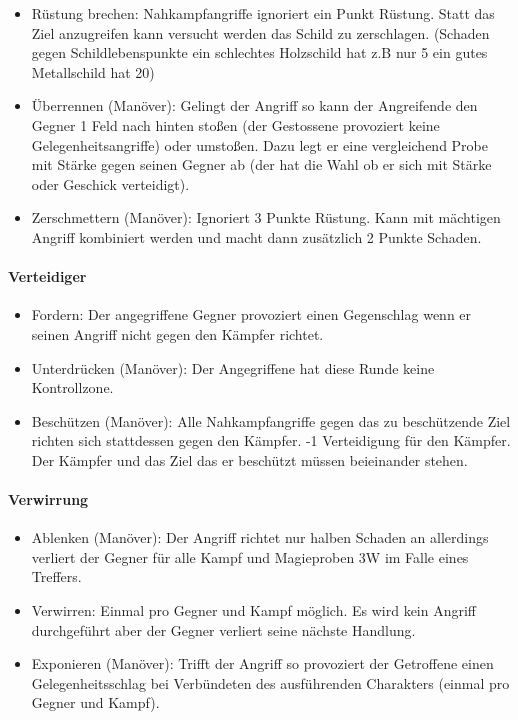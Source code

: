 \documentclass{article}
\begin{document}
\begin{itemize}
\item Rüstung brechen: Nahkampfangriffe ignoriert ein Punkt Rüstung. Statt das Ziel anzugreifen kann versucht werden das Schild zu zerschlagen. (Schaden gegen Schildlebenspunkte ein schlechtes Holzschild  hat z.B nur 5 ein gutes Metallschild hat 20)
\item Überrennen (Manöver): Gelingt der Angriff so kann der Angreifende den Gegner 1 Feld nach hinten stoßen (der Gestossene provoziert keine Gelegenheitsangriffe) oder umstoßen. Dazu legt er eine vergleichend Probe mit Stärke gegen seinen Gegner ab (der hat die Wahl ob er sich mit Stärke oder Geschick verteidigt).
\item Zerschmettern (Manöver): Ignoriert 3 Punkte Rüstung. Kann mit mächtigen Angriff kombiniert werden und macht dann zusätzlich 2 Punkte Schaden.
\end{itemize}

\paragraph{Verteidiger}

\begin{itemize}
\item Fordern: Der angegriffene Gegner provoziert einen Gegenschlag wenn er seinen Angriff nicht gegen den Kämpfer richtet.
\item Unterdrücken (Manöver): Der Angegriffene hat diese Runde keine Kontrollzone.
\item Beschützen (Manöver): Alle Nahkampfangriffe gegen das zu beschützende Ziel richten sich stattdessen gegen den Kämpfer. -1 Verteidigung für den Kämpfer. Der Kämpfer und das Ziel das er beschützt müssen beieinander stehen.
\end{itemize}

\paragraph{Verwirrung}

\begin{itemize}
\item Ablenken (Manöver): Der Angriff richtet nur halben Schaden an allerdings verliert der Gegner für alle Kampf und Magieproben 3W im Falle eines Treffers.
\item Verwirren: Einmal pro Gegner und Kampf möglich. Es wird kein Angriff durchgeführt aber der Gegner verliert seine nächste Handlung.
\item Exponieren (Manöver): Trifft der Angriff so provoziert der Getroffene einen Gelegenheitsschlag bei Verbündeten des ausführenden Charakters (einmal pro Gegner und Kampf).
\end{itemize}
\end{document}
